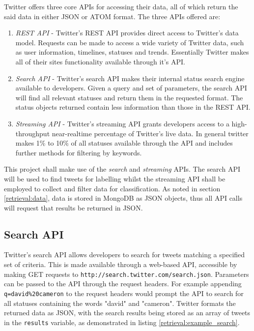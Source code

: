 Twitter offers three core APIs for accessing their data, all of which return the said data in either JSON or ATOM format. The three APIs offered are:

\begin{enumerate}
	\item \emph{REST API} - Twitter's REST API provides direct access to Twitter's data model. Requests can be made to access a wide variety of Twitter data, such as user information, timelines, statuses and trends. Essentially Twitter makes all of their sites functionality available through it's API.
	\item \emph{Search API} - Twitter's search API makes their internal status search engine available to developers. Given a query and set of parameters, the search API will find all relevant statuses and return them in the requested format. The status objects returned contain less information than those in the REST API.
	\item \emph{Streaming API} - Twitter's streaming API grants developers access to a high-throughput near-realtime percentage of Twitter's live data. In general twitter makes 1\% to 10\% of all statuses available through the API and includes further methods for filtering by keywords.
\end{enumerate}

This project shall make use of the \emph{search} and \emph{streaming} APIs. The search API will be used to find tweets for labelling whilst the streaming API shall be employed to collect and filter data for classification. As noted in section \ref{retrieval:data}, data is stored in MongoDB as JSON objects, thus all API calls will request that results be returned in JSON.

\subsection{Search API}

Twitter's search API allows developers to search for tweets matching a specified set of criteria. This is made available through a web-based API, accessible by making GET requests to \texttt{http://\-search\-.\-twitter\-.\-com\-/\-search\-.\-json}. Parameters can be passed to the API through the request headers. For example appending \texttt{q=\-david\-\%20cameron} to the request headers would prompt the API to search for all statuses containing the words "david" and "cameron". Twitter formats the returned data as JSON, with the search results being stored as an array of tweets in the \texttt{results} variable, as demonstrated in listing \ref{retrieval:example_search}.

